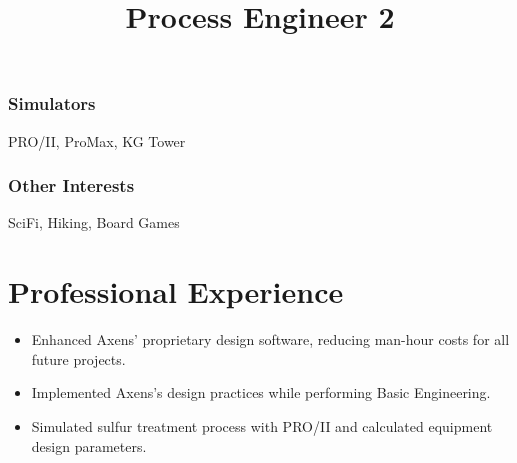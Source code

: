 \documentclass[12pt]{res} %
\begin{document}
\begin{resume}
\begin{multicols}{3}
            \subsubsection{Simulators}
            \vspace{-22pt}
            PRO/II, ProMax, KG Tower
            \vspace{-28pt}

            \subsubsection{Other Interests}
            \vspace{-22pt}
            SciFi, Hiking, Board Games

            \vspace{-12pt}

          \end{multicols}
        \vspace{-24pt}

      \section{Professional Experience}
        \title{\textbf{Process Engineer 2}}
        \begin{position}
          \vspace{-14pt}
          \begin{itemize}[leftmargin=-0.4cm]
          \itemsep0em
          \item Enhanced Axens' proprietary design software, reducing man-hour costs for all future projects.
          \item Implemented Axens's design practices while performing Basic Engineering.
          \item Simulated sulfur treatment process with PRO/II and calculated equipment design parameters.
          \end{itemize}
        \end{position}
        \vspace{-10pt}


\end{resume}
\end{document}

